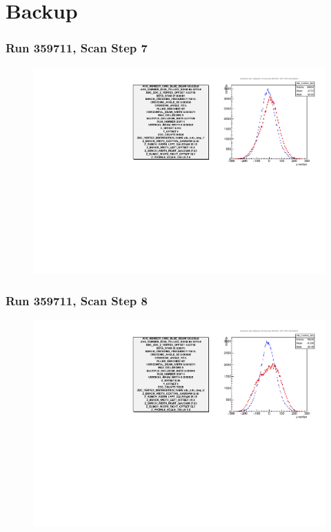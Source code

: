 \section{Backup}

\begin{frame}
\frametitle{Run 359711, Scan Step 7}
\begin{figure}
\begin{center}
\includegraphics[width=\linewidth]{"figs/359711_step_7_zdc_zvertex"}
\caption{ }
\label{fig:359711_step_7_zdc_zvertex}
\end{center}\end{figure}
\end{frame}

\begin{frame}
\frametitle{Run 359711, Scan Step 8}
\begin{figure}
\begin{center}
\includegraphics[width=\linewidth]{"figs/359711_step_8_zdc_zvertex"}
\caption{ }
\label{fig:359711_step_8_zdc_zvertex}
\end{center}\end{figure}
\end{frame}

